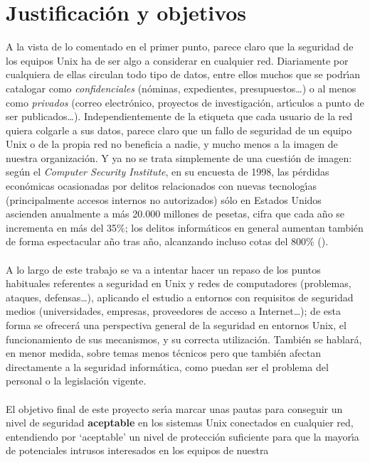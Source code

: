 \section{Justificaci\'on y objetivos}
A la vista de lo comentado en el primer punto, parece claro que la seguridad de
los equipos Unix ha de ser algo a considerar en cualquier red. Diariamente 
por cualquiera de ellas circulan todo tipo de datos, entre ellos muchos que se 
podr\'{\i}an catalogar como {\it confidenciales} (n\'ominas, expedientes, 
presupuestos\ldots) o al menos
como {\it privados} (correo electr\'onico, proyectos de investigaci\'on, 
art\'{\i}culos a punto de ser publicados\ldots). Independientemente de la 
etiqueta que cada
usuario de la red quiera colgarle a sus datos, parece claro que un fallo de
seguridad de un equipo Unix o de la propia red no beneficia a nadie, y mucho 
menos a la imagen de nuestra organizaci\'on. Y ya no se
trata simplemente de una cuesti\'on de imagen: seg\'un el {\it  Computer 
Security Institute}, en su encuesta de 1998, las p\'erdidas econ\'omicas 
ocasionadas por delitos relacionados con nuevas tecnolog\'{\i}as 
(principalmente accesos internos no autorizados) s\'olo en 
Estados Unidos ascienden anualmente a m\'as 20.000 millones de pesetas, cifra
que cada a\~no se incrementa en m\'as del 35\%; los delitos inform\'aticos
en general aumentan tambi\'en de forma espectacular a\~no tras a\~no, alcanzando
incluso cotas del 800\% (\cite{kn:san82}).\\
\\A lo largo de este trabajo se va a intentar hacer un repaso de los puntos 
habituales referentes a seguridad en Unix y redes de computadores (problemas, 
ataques, defensas\ldots), aplicando el estudio a entornos con requisitos de 
seguridad medios (universidades, empresas, proveedores de acceso a 
Internet\ldots); de esta forma se ofrecer\'a una perspectiva general de la 
seguridad en
entornos Unix, el funcionamiento de sus mecanismos, y su correcta utilizaci\'on.
Tambi\'en se hablar\'a, en menor medida, sobre temas menos t\'ecnicos
pero que tambi\'en afectan directamente a la seguridad inform\'atica, como 
puedan ser el problema del personal o la legislaci\'on vigente.\\
\\El objetivo final de este proyecto ser\'{\i}a marcar unas pautas para 
conseguir un nivel de seguridad {\bf aceptable} en los sistemas Unix conectados
en cualquier red,
entendiendo por `aceptable' un nivel de protecci\'on suficiente para que la 
mayor\'{\i}a de potenciales intrusos interesados en los equipos de nuestra
